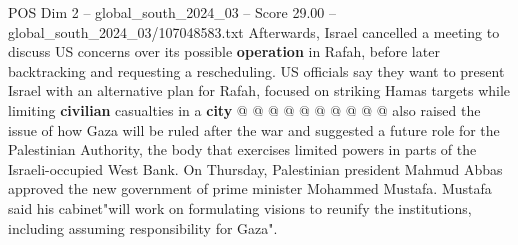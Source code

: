 \begin{textsample}{POS Dim 2 – global\_south\_2024\_03 – Score 29.00 – global\_south\_2024\_03/107048583.txt}
Afterwards, Israel cancelled a meeting to discuss US concerns over its possible \textbf{operation} in Rafah, before later backtracking and requesting a rescheduling.
US officials say they want to present Israel with an alternative plan for Rafah, focused on striking Hamas targets while limiting \textbf{civilian} casualties in a \textbf{city} @ @ @ @ @ @ @ @ @ @ also raised the issue of how Gaza will be ruled after the war and suggested a future role for the Palestinian Authority, the body that exercises limited powers in parts of the Israeli-occupied West Bank.
On Thursday, Palestinian president Mahmud Abbas approved the new government of prime minister Mohammed Mustafa.
Mustafa said his cabinet"will work on formulating visions to reunify the institutions, including assuming responsibility for Gaza".

\end{textsample}
